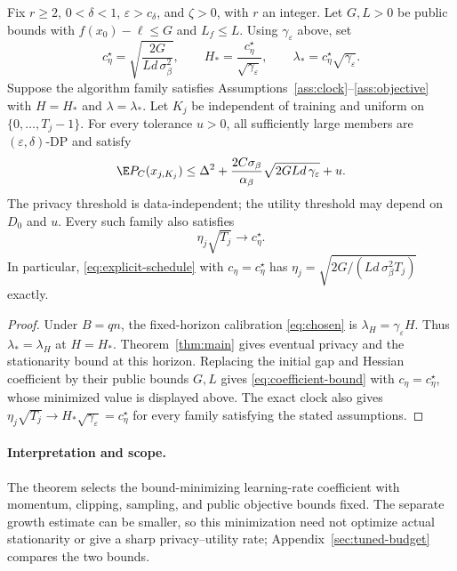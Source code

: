\begin{theorem}\label{cor:horizon-tuned}
Fix $r\geq2$, $0<\delta<1$, $\varepsilon>c_\delta$, and
$\zeta>0$, with $r$ an integer.
Let $G,L>0$ be public bounds with $f(x_0)-\ell\leq G$ and $L_f\leq L$.
Using $\gamma_\varepsilon$ above, set
\[
 c_\eta^\star=\sqrt{\frac{2G}{Ld\,\sigma_\beta^2}},\qquad
 H_*=\frac{c_\eta^\star}{\sqrt{\gamma_\varepsilon}},\qquad
\lambda_*=c_\eta^\star\sqrt{\gamma_\varepsilon}.
\]
Suppose the algorithm family satisfies
Assumptions~\ref{ass:clock}--\ref{ass:objective} with $H=H_*$ and
$\lambda=\lambda_*$. Let $K_j$ be independent of training
and uniform on $\{0,\ldots,T_j-1\}$. For every tolerance $u>0$, all sufficiently
large members are $(\varepsilon,\delta)$-DP and satisfy
\[
 \E P_C(x_{j,K_j})
 \leq \Delta^2+\frac{2C\sigma_\beta}{\alpha_\beta}
      \sqrt{2GLd\,\gamma_\varepsilon}+u.
\]
The privacy threshold is data-independent; the utility threshold may
depend on $D_0$ and $u$. Every such family also satisfies
\[
 \eta_j\sqrt{T_j}\longrightarrow c_\eta^\star.
\]
In particular, \eqref{eq:explicit-schedule} with $c_\eta=c_\eta^\star$
has $\eta_j=\sqrt{2G/(Ld\,\sigma_\beta^2T_j)}$ exactly.
\end{theorem}
\begin{proof}
Under $B=qn$, the fixed-horizon calibration \eqref{eq:chosen} is
$\lambda_H=\gamma_\varepsilon H$. Thus
$\lambda_*=\lambda_H$ at $H=H_*$. Theorem~\ref{thm:main} gives eventual
privacy and the stationarity bound at this horizon. Replacing the initial
gap and Hessian coefficient by their public bounds $G,L$ gives
\eqref{eq:coefficient-bound} with $c_\eta=c_\eta^\star$, whose minimized
value is displayed above. The exact clock also gives
$\eta_j\sqrt{T_j}\to H_*\sqrt{\gamma_\varepsilon}=c_\eta^\star$ for every
family satisfying the stated assumptions.
\end{proof}

\paragraph{Interpretation and scope.}
The theorem selects the bound-minimizing learning-rate coefficient with
momentum, clipping, sampling, and public objective bounds fixed. The separate
growth estimate can be smaller, so this minimization need not optimize actual
stationarity or give a sharp privacy--utility rate; Appendix~\ref{sec:tuned-budget}
compares the two bounds.

